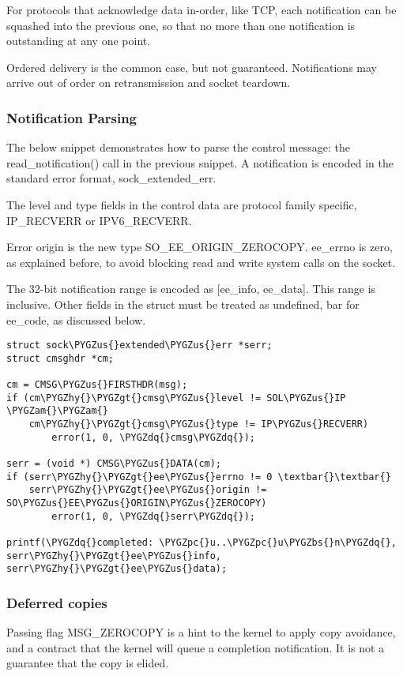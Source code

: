 \documentclass[a4paper,8pt,english]{sphinxmanual}
\def\PYGZbs{\char`\\}
\def\PYGZus{\char`\_}
\def\PYGZam{\char`\&}
\def\PYGZgt{\char`\>}
\def\PYGZpc{\char`\%}
\def\PYGZhy{\char`\-}
\def\PYGZdq{\char`\"}
\begin{document}
For protocols that acknowledge data in-order, like TCP, each
notification can be squashed into the previous one, so that no more
than one notification is outstanding at any one point.

Ordered delivery is the common case, but not guaranteed. Notifications
may arrive out of order on retransmission and socket teardown.


\subsubsection{Notification Parsing}
\label{networking/msg_zerocopy:notification-parsing}
The below snippet demonstrates how to parse the control message: the
read\_notification() call in the previous snippet. A notification
is encoded in the standard error format, sock\_extended\_err.

The level and type fields in the control data are protocol family
specific, IP\_RECVERR or IPV6\_RECVERR.

Error origin is the new type SO\_EE\_ORIGIN\_ZEROCOPY. ee\_errno is zero,
as explained before, to avoid blocking read and write system calls on
the socket.

The 32-bit notification range is encoded as {[}ee\_info, ee\_data{]}. This
range is inclusive. Other fields in the struct must be treated as
undefined, bar for ee\_code, as discussed below.

\begin{Verbatim}[commandchars=\\\{\}]
struct sock\PYGZus{}extended\PYGZus{}err *serr;
struct cmsghdr *cm;

cm = CMSG\PYGZus{}FIRSTHDR(msg);
if (cm\PYGZhy{}\PYGZgt{}cmsg\PYGZus{}level != SOL\PYGZus{}IP \PYGZam{}\PYGZam{}
    cm\PYGZhy{}\PYGZgt{}cmsg\PYGZus{}type != IP\PYGZus{}RECVERR)
        error(1, 0, \PYGZdq{}cmsg\PYGZdq{});

serr = (void *) CMSG\PYGZus{}DATA(cm);
if (serr\PYGZhy{}\PYGZgt{}ee\PYGZus{}errno != 0 \textbar{}\textbar{}
    serr\PYGZhy{}\PYGZgt{}ee\PYGZus{}origin != SO\PYGZus{}EE\PYGZus{}ORIGIN\PYGZus{}ZEROCOPY)
        error(1, 0, \PYGZdq{}serr\PYGZdq{});

printf(\PYGZdq{}completed: \PYGZpc{}u..\PYGZpc{}u\PYGZbs{}n\PYGZdq{}, serr\PYGZhy{}\PYGZgt{}ee\PYGZus{}info, serr\PYGZhy{}\PYGZgt{}ee\PYGZus{}data);
\end{Verbatim}


\subsubsection{Deferred copies}
\label{networking/msg_zerocopy:deferred-copies}
Passing flag MSG\_ZEROCOPY is a hint to the kernel to apply copy
avoidance, and a contract that the kernel will queue a completion
notification. It is not a guarantee that the copy is elided.
\end{document}
